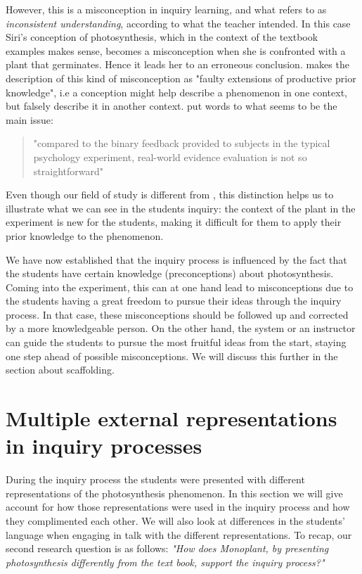 However, this is a misconception in inquiry learning, and what \citet{gomez2008elementary} refers to as \emph{inconsistent understanding}, according to what the teacher intended. In this case Siri's conception of photosynthesis, which in the context of the textbook examples makes sense, becomes a misconception when she is confronted with a plant that germinates. Hence it leads her to an erroneous conclusion. \citet{smith1994misconceptions} makes the description of this kind of misconception as "faulty extensions of productive prior knowledge", i.e a conception might help describe a phenomenon in one context, but falsely describe it in another context. \citeauthor*{klahr1993heuristics} put words to what seems to be the main issue: 

\begin{quote}"compared to the binary feedback provided to subjects in the typical psychology experiment, real-world evidence evaluation is not so straightforward" \citetext{\citet[p. 114]{klahr1993heuristics}, referenced in \citealp{de1998scientific}}
\end{quote}

Even though our field of study is different from \citeauthor{klahr1993heuristics}, this distinction helps us to illustrate what we can see in the students inquiry: the context of the plant in the experiment is new for the students, making it difficult for them to apply their prior knowledge to the phenomenon.  

We have now established that the inquiry process is influenced by the fact that the students have certain knowledge (preconceptions) about photosynthesis. Coming into the experiment, this can at one hand lead to misconceptions due to the students having a great freedom to pursue their ideas through the inquiry process. In that case, these misconceptions should be followed up and corrected by a more knowledgeable person. On the other hand, the system or an instructor can guide the students to pursue the most fruitful ideas from the start, staying one step ahead of possible misconceptions. We will discuss this further in the section about scaffolding.



\section{Multiple external representations in inquiry processes}
During the inquiry process the students were presented with different representations of the photosynthesis phenomenon. In this section we will give account for how those representations were used in the inquiry process and how they complimented each other. We will also look at differences in the students' language when engaging in talk with the different representations. To recap, our second research question is as follows: \emph{"How does Monoplant, by presenting photosynthesis differently from the text book, support the inquiry process?"}

